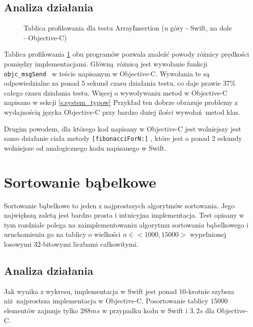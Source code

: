 \documentclass[mgr, shortabstract]{iithesis}
\newcommand{\objcinline}[1]{
    \texttt{#1}
}
\begin{document}
\subsection{Analiza działania}

\begin{figure}
    \caption{Tablica profilowania dla testu ArrayInsertion (u góry - Swift, na dole - Objective-C)}
    \label{i:fibonacci}
\end{figure}

Tablica profilowania \ref{i:fibonacci} obu programów pozwala znaleźć powody różnicy prędkości pomiędzy implementacjami. Główną różnicą jest wywołanie funkcji \objcinline{objc_msgSend } w teście napisanym w Objective-C. Wywołania te są odpowiedzialne za ponad 5 sekund czasu działania testu, co daje prawie 37\% całego czasu działania testu. Więcej o wywoływaniu metod w Objective-C napisano w sekcji \ref{s:system_typow} Przykład ten dobrze obrazuje problemy z wydajnością języka Objective-C przy bardzo dużej ilości wywołań metod klas.

Drugim powodem, dla którego kod napisany w Objective-C jest wolniejszy jest samo działanie ciała metody \objcinline{[fibonacciForN:]}, które jest o ponad 2 sekundy wolniejsze od analogicznego kodu napisanego w Swift.

\section{Sortowanie bąbelkowe}
Sortowanie bąbelkowe to jeden z najprostszych algorytmów sortowania. Jego największą zaletą jest bardzo prosta i intuicyjna implementacja. Test opisany w tym rozdziale polega na zaimplementowaniu algorytmu sortowania bąbelkowego i uruchomieniu go na tablicy o wielkości $n \in <1000, 15000>$ wypełnionej losowymi 32-bitowymi liczbami całkowitymi.

\subsection{Analiza działania}

Jak wynika z wykresu, implementacja w Swift jest ponad 10-krotnie szybsza niż najprostsza implementacja w Objective-C. Posortowanie tablicy $15000$ elementów zajmuje tylko $288 ms$ w przypadku kodu w Swift i $3,2 s$ dla Objective-C.
\end{document}
